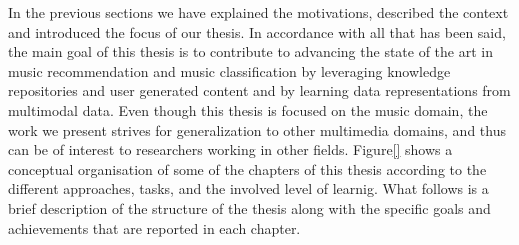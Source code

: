 In the previous sections we have explained the motivations, described the context and introduced the focus of our thesis. In accordance with all that has been said, the main goal of this thesis is to contribute to advancing the state of the art in music recommendation and music classification by leveraging knowledge repositories and user generated content and by learning data representations from multimodal data. Even though this thesis is focused on the music domain, the work we present strives for generalization to other multimedia domains, and thus can be of interest to researchers working in other fields. Figure\ref{} shows a conceptual organisation of some of the chapters of this thesis according to the different approaches, tasks, and the involved level of learnig. What follows is a brief description of the structure of the thesis along with the specific goals and achievements that are reported in each chapter.
